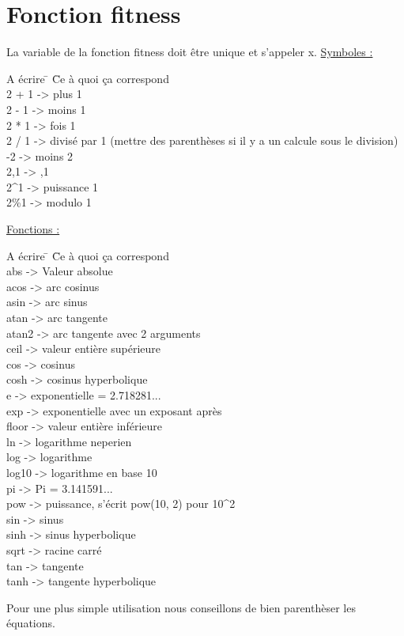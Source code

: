 \documentclass[a4paper,11pt]{article}
\begin{document}
\section{Fonction fitness}
La variable de la fonction fitness doit être unique et s'appeler x.
	\underline{Symboles :}\\
\begin{tabbing}
A écrire	\hspace{0.5cm} \=	\hspace{1cm}  \=Ce à quoi ça correspond\\
2 + 1		\>->  plus 1\\
2 - 1		\>->  moins 1\\
2 * 1		\>->  fois 1\\
2 / 1		\>->  divisé par 1 (mettre des parenthèses si il y a un calcule sous le division)\\
-2			\>-> \>moins 2\\
2,1		\>-> ,1\\
2\^{}1			\>->  puissance 1\\
2\%1		\>->  modulo 1\\
\end{tabbing}

	\underline{Fonctions :}\\
\begin{tabbing}
A écrire	\hspace{0.5cm} \=	\hspace{1cm}  \=Ce à quoi ça correspond\\
abs			\>->	\>Valeur absolue\\
acos		\>->	\>arc cosinus\\
asin		\>->	\>arc sinus\\
atan		\>->	\>arc tangente\\
atan2		\>->	\>arc tangente avec 2 arguments\\
ceil		\>->	\>valeur entière supérieure\\
cos			\>->	\>cosinus\\
cosh		\>->	\>cosinus hyperbolique\\
e			\>->	\>exponentielle = 2.718281...\\
exp			\>->	\>exponentielle avec un exposant après\\
floor		\>->	\>valeur entière inférieure\\
ln			\>->  \>logarithme neperien\\
log			\>->  \>logarithme\\
log10		\>->	\>logarithme en base 10\\
pi			\>->	\>Pi = 3.141591...\\
pow			\>->	\>puissance, s'écrit pow(10, 2) pour 10\^{}2\\
sin			\>->	\>sinus\\
sinh		\>->	\>sinus hyperbolique\\
sqrt		\>->	\>racine carré\\
tan			\>->	\>tangente\\
tanh		\>->	\>tangente hyperbolique\\
\end{tabbing}
Pour une plus simple utilisation nous conseillons de bien parenthèser les équations.\\
\end{document}
